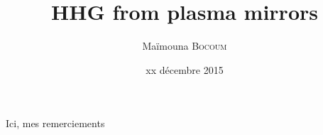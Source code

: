 \documentclass[a4paper,12pt,french]{report}
\author{Maïmouna \scshape{Bocoum}}
\title{HHG from plasma mirrors}
\date{xx décembre 2015}
\date{}
\begin{document}
\pagedegarde
\cleardoublepage

Ici, mes remerciements

\clearpage
\dominitoc

\tableofcontents
%
%

%

 
%









%
%
%
%

\appendix                  

%
%
     
\listoffigures             

\listoftables              

%
%

\cleardoublepage
\newpage
\thispagestyle{empty}


%
	\begin{appendix}
		
	
	\end{appendix}





\end{document}
